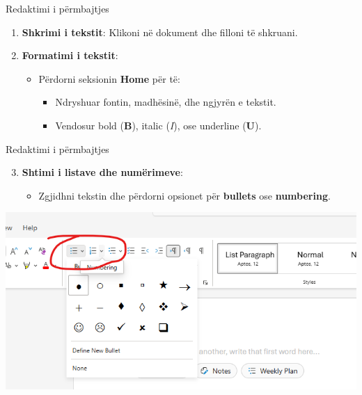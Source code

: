 \documentclass[
  ignorenonframetext,
]{beamer}
\providecommand{\tightlist}{%
  \setlength{\itemsep}{0pt}\setlength{\parskip}{0pt}}
\begin{document}
\begin{frame}{Redaktimi i përmbajtjes}
\label{redaktimi-i-puxebrmbajtjes}
\begin{enumerate}
\item
  \textbf{Shkrimi i tekstit}: Klikoni në dokument dhe filloni të
  shkruani.
\item
  \textbf{Formatimi i tekstit}:

  \begin{itemize}
  \item
    Përdorni seksionin \textbf{Home} për të:

    \begin{itemize}
    \item
      Ndryshuar fontin, madhësinë, dhe ngjyrën e tekstit.
    \item
      Vendosur bold (\textbf{B}), italic (\emph{I}), ose underline
      (\textbf{U}).
    \end{itemize}
  \end{itemize}
\end{enumerate}
\end{frame}

\begin{frame}{Redaktimi i përmbajtjes}
\label{redaktimi-i-puxebrmbajtjes-1}
\begin{enumerate}
\setcounter{enumi}{2}
\item
  \textbf{Shtimi i listave dhe numërimeve}:

  \begin{itemize}
  \tightlist
  \item
    Zgjidhni tekstin dhe përdorni opsionet për \textbf{bullets} ose
    \textbf{numbering}.
  \end{itemize}
\end{enumerate}

\includegraphics{./images/word4.png}
\end{frame}
\end{document}
